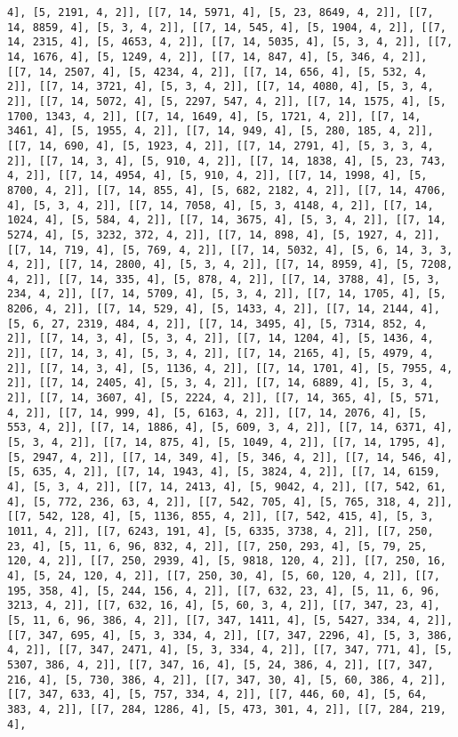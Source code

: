 \documentclass[12pt,fleqn]{article}\usepackage{../../common}
\begin{document}
\begin{verbatim}
4], [5, 2191, 4, 2]], [[7, 14, 5971, 4], [5, 23, 8649, 4, 2]], [[7, 14, 8859, 4], [5, 3, 4, 2]], [[7, 14, 545, 4], [5, 1904, 4, 2]], [[7, 14, 2315, 4], [5, 4653, 4, 2]], [[7, 14, 5035, 4], [5, 3, 4, 2]], [[7, 14, 1676, 4], [5, 1249, 4, 2]], [[7, 14, 847, 4], [5, 346, 4, 2]], [[7, 14, 2507, 4], [5, 4234, 4, 2]], [[7, 14, 656, 4], [5, 532, 4, 2]], [[7, 14, 3721, 4], [5, 3, 4, 2]], [[7, 14, 4080, 4], [5, 3, 4, 2]], [[7, 14, 5072, 4], [5, 2297, 547, 4, 2]], [[7, 14, 1575, 4], [5, 1700, 1343, 4, 2]], [[7, 14, 1649, 4], [5, 1721, 4, 2]], [[7, 14, 3461, 4], [5, 1955, 4, 2]], [[7, 14, 949, 4], [5, 280, 185, 4, 2]], [[7, 14, 690, 4], [5, 1923, 4, 2]], [[7, 14, 2791, 4], [5, 3, 3, 4, 2]], [[7, 14, 3, 4], [5, 910, 4, 2]], [[7, 14, 1838, 4], [5, 23, 743, 4, 2]], [[7, 14, 4954, 4], [5, 910, 4, 2]], [[7, 14, 1998, 4], [5, 8700, 4, 2]], [[7, 14, 855, 4], [5, 682, 2182, 4, 2]], [[7, 14, 4706, 4], [5, 3, 4, 2]], [[7, 14, 7058, 4], [5, 3, 4148, 4, 2]], [[7, 14, 1024, 4], [5, 584, 4, 2]], [[7, 14, 3675, 4], [5, 3, 4, 2]], [[7, 14, 5274, 4], [5, 3232, 372, 4, 2]], [[7, 14, 898, 4], [5, 1927, 4, 2]], [[7, 14, 719, 4], [5, 769, 4, 2]], [[7, 14, 5032, 4], [5, 6, 14, 3, 3, 4, 2]], [[7, 14, 2800, 4], [5, 3, 4, 2]], [[7, 14, 8959, 4], [5, 7208, 4, 2]], [[7, 14, 335, 4], [5, 878, 4, 2]], [[7, 14, 3788, 4], [5, 3, 234, 4, 2]], [[7, 14, 5709, 4], [5, 3, 4, 2]], [[7, 14, 1705, 4], [5, 8206, 4, 2]], [[7, 14, 529, 4], [5, 1433, 4, 2]], [[7, 14, 2144, 4], [5, 6, 27, 2319, 484, 4, 2]], [[7, 14, 3495, 4], [5, 7314, 852, 4, 2]], [[7, 14, 3, 4], [5, 3, 4, 2]], [[7, 14, 1204, 4], [5, 1436, 4, 2]], [[7, 14, 3, 4], [5, 3, 4, 2]], [[7, 14, 2165, 4], [5, 4979, 4, 2]], [[7, 14, 3, 4], [5, 1136, 4, 2]], [[7, 14, 1701, 4], [5, 7955, 4, 2]], [[7, 14, 2405, 4], [5, 3, 4, 2]], [[7, 14, 6889, 4], [5, 3, 4, 2]], [[7, 14, 3607, 4], [5, 2224, 4, 2]], [[7, 14, 365, 4], [5, 571, 4, 2]], [[7, 14, 999, 4], [5, 6163, 4, 2]], [[7, 14, 2076, 4], [5, 553, 4, 2]], [[7, 14, 1886, 4], [5, 609, 3, 4, 2]], [[7, 14, 6371, 4], [5, 3, 4, 2]], [[7, 14, 875, 4], [5, 1049, 4, 2]], [[7, 14, 1795, 4], [5, 2947, 4, 2]], [[7, 14, 349, 4], [5, 346, 4, 2]], [[7, 14, 546, 4], [5, 635, 4, 2]], [[7, 14, 1943, 4], [5, 3824, 4, 2]], [[7, 14, 6159, 4], [5, 3, 4, 2]], [[7, 14, 2413, 4], [5, 9042, 4, 2]], [[7, 542, 61, 4], [5, 772, 236, 63, 4, 2]], [[7, 542, 705, 4], [5, 765, 318, 4, 2]], [[7, 542, 128, 4], [5, 1136, 855, 4, 2]], [[7, 542, 415, 4], [5, 3, 1011, 4, 2]], [[7, 6243, 191, 4], [5, 6335, 3738, 4, 2]], [[7, 250, 23, 4], [5, 11, 6, 96, 832, 4, 2]], [[7, 250, 293, 4], [5, 79, 25, 120, 4, 2]], [[7, 250, 2939, 4], [5, 9818, 120, 4, 2]], [[7, 250, 16, 4], [5, 24, 120, 4, 2]], [[7, 250, 30, 4], [5, 60, 120, 4, 2]], [[7, 195, 358, 4], [5, 244, 156, 4, 2]], [[7, 632, 23, 4], [5, 11, 6, 96, 3213, 4, 2]], [[7, 632, 16, 4], [5, 60, 3, 4, 2]], [[7, 347, 23, 4], [5, 11, 6, 96, 386, 4, 2]], [[7, 347, 1411, 4], [5, 5427, 334, 4, 2]], [[7, 347, 695, 4], [5, 3, 334, 4, 2]], [[7, 347, 2296, 4], [5, 3, 386, 4, 2]], [[7, 347, 2471, 4], [5, 3, 334, 4, 2]], [[7, 347, 771, 4], [5, 5307, 386, 4, 2]], [[7, 347, 16, 4], [5, 24, 386, 4, 2]], [[7, 347, 216, 4], [5, 730, 386, 4, 2]], [[7, 347, 30, 4], [5, 60, 386, 4, 2]], [[7, 347, 633, 4], [5, 757, 334, 4, 2]], [[7, 446, 60, 4], [5, 64, 383, 4, 2]], [[7, 284, 1286, 4], [5, 473, 301, 4, 2]], [[7, 284, 219, 4], 
\end{verbatim}
\end{document}
